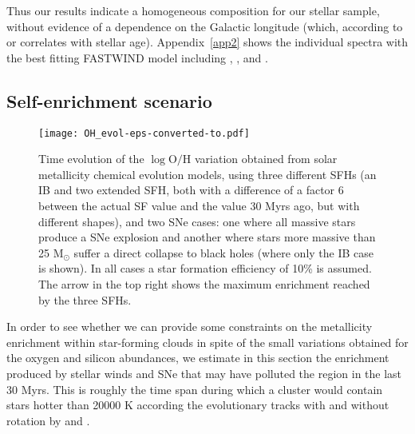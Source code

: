\documentclass{aa} %
\begin{document}
Thus our results indicate a homogeneous composition for our stellar sample, without evidence of a dependence on the Galactic longitude (which, according to \cite{com12} or \cite{berlanas17} correlates with stellar age). Appendix~\ref{app2} shows the individual spectra with the best fitting FASTWIND model including , ,  and .


\subsection{Self-enrichment scenario}\label{sect43}

\begin{figure}[t!]
\centering
\texttt{[image: OH\_evol-eps-converted-to.pdf]}
\caption{Time evolution of the $\log \mathrm{O}/\mathrm{H}$ variation obtained from solar metallicity chemical evolution models, using three different SFHs (an IB and two extended SFH, both with a difference of a factor 6 between the actual SF value and the value 30 Myrs ago, but with different shapes), and two SNe cases: one where all massive stars produce a SNe explosion and another where stars more massive than 25 M$_{\odot}$ suffer a direct collapse to black holes (where only the IB case is shown). In all cases a star formation efficiency of 10\% is assumed. The arrow in the top right shows the maximum enrichment reached by the three SFHs.}
\label{figOH}
\end{figure}


In order to see whether we can provide some constraints on the metallicity enrichment within star-forming clouds in spite of the small variations obtained for the oxygen and silicon abundances, we estimate in this section the enrichment produced by stellar winds and SNe that may have polluted the region in the last 30 Myrs. This is roughly the time span during which a cluster would contain stars hotter than 20000 K according the  evolutionary tracks with and without rotation by \citealt{ekstrom12} and \citealt{LC18}. 
\end{document}
